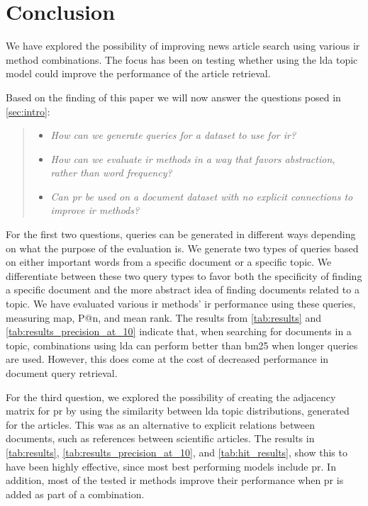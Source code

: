 \section{Conclusion}\label{sec:conclusion}
We have explored the possibility of improving news article search using various \gls{ir} method combinations.
The focus has been on testing whether using the \gls{lda} topic model could improve the performance of the article retrieval.

Based on the finding of this paper we will now answer the questions posed in \autoref{sec:intro}:
\begin{quote}
	\begin{itemize}
		\item \emph{How can we generate queries for a dataset to use for \gls{ir}?}
		\item \emph{How can we evaluate \gls{ir} methods in a way that favors abstraction, rather than word frequency?}
		\item \emph{Can \gls{pr} be used on a document dataset with no explicit connections to improve \gls{ir} methods?}
	\end{itemize}
\end{quote}

For the first two questions, queries can be generated in different ways depending on what the purpose of the evaluation is.
We generate two types of queries based on either important words from a specific document or a specific topic.
We differentiate between these two query types to favor both the specificity of finding a specific document and the more abstract idea of finding documents related to a topic.
We have evaluated various \gls{ir} methods' \gls{ir} performance using these queries, measuring \acrlong{map}, P@n, and mean rank.
The results from \autoref{tab:results} and \autoref{tab:results_precision_at_10} indicate that, when searching for documents in a topic, combinations using \gls{lda} can perform better than \gls{bm25} when longer queries are used.
However, this does come at the cost of decreased performance in document query retrieval.

For the third question, we explored the possibility of creating the adjacency matrix for \gls{pr} by using the similarity between \gls{lda} topic distributions, generated for the articles.
This was as an alternative to explicit relations between documents, such as references between scientific articles.
The results in \autoref{tab:results}, \autoref{tab:results_precision_at_10}, and \autoref{tab:hit_results}, show this to have been highly effective, since most best performing models include \gls{pr}.
In addition, most of the tested \gls{ir} methods improve their performance when \gls{pr} is added as part of a combination.
